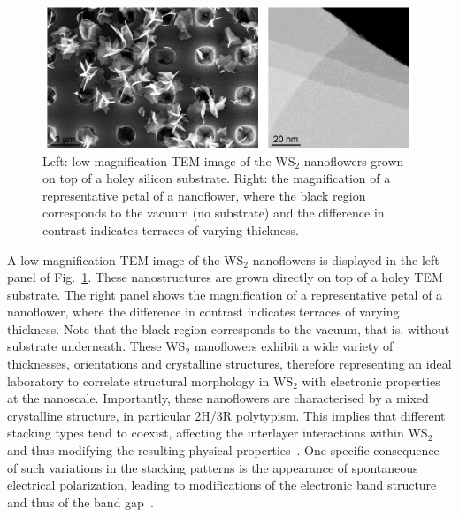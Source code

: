 \begin{figure}[t]
    \centering
    \includegraphics[width=0.99\textwidth]{plots/TEMwE-full-figure-withscales-centred-1.pdf}
    \caption{Left: low-magnification TEM image of the WS$_2$ nanoflowers
      grown on top of a holey silicon substrate.
      Right: the magnification of a
      representative petal
      of a nanoflower, where the black region corresponds to the vacuum (no substrate)
      and the difference in contrast indicates terraces of varying thickness.
       }
    \label{fig:nanoflowers}
\end{figure}

A low-magnification TEM image of the WS$_2$ nanoflowers is displayed
in the left panel of Fig.~\ref{fig:nanoflowers}.
%
These nanostructures are grown directly on top of a holey TEM substrate.
%
The right panel shows the magnification of a
representative petal
of a nanoflower, where
the difference in contrast indicates terraces of varying thickness.
%
Note that the black region corresponds to the vacuum, that is, without
substrate underneath.
%
These WS$_2$ nanoflowers exhibit a wide variety of thicknesses, orientations
and crystalline structures, therefore representing an ideal laboratory to correlate
structural morphology in WS$_2$ with electronic properties at the nanoscale.
%
Importantly, these nanoflowers are characterised by a mixed crystalline structure,
in particular 2H/3R polytypism.
%
This implies that different stacking types tend to coexist,  affecting
the interlayer interactions within WS$_2$
and thus modifying the resulting physical properties~\cite{Na:2018}.
%
One specific consequence of such variations in the stacking patterns is the appearance of
spontaneous electrical polarization, leading to modifications of the 
electronic band structure and thus of the band gap~\cite{Lee:2016}.



